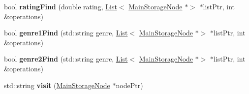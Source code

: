 \begin{DoxyCompactItemize}
\item 
\mbox{\label{class_main_storage_aeb4e48db87901ecb60d3ece8aa3c44ee}} 
bool {\bfseries rating\+Find} (double rating, \hyperlink{class_list}{List}$<$ \hyperlink{class_main_storage_node}{Main\+Storage\+Node} $\ast$$>$ $\ast$list\+Ptr, int \&operations)
\item 
\mbox{\label{class_main_storage_acc8e3b85d74cffa65ae1804c00fcdc48}} 
bool {\bfseries genre1\+Find} (std\+::string genre, \hyperlink{class_list}{List}$<$ \hyperlink{class_main_storage_node}{Main\+Storage\+Node} $\ast$$>$ $\ast$list\+Ptr, int \&operations)
\item 
\mbox{\label{class_main_storage_a95ea93d5b8bf1718b939fe21fb601695}} 
bool {\bfseries genre2\+Find} (std\+::string genre, \hyperlink{class_list}{List}$<$ \hyperlink{class_main_storage_node}{Main\+Storage\+Node} $\ast$$>$ $\ast$list\+Ptr, int \&operations)
\item 
\mbox{\label{class_main_storage_af0bbc44a648395b758a8f8664d7b1fa6}} 
std\+::string {\bfseries visit} (\hyperlink{class_main_storage_node}{Main\+Storage\+Node} $\ast$node\+Ptr)
\end{DoxyCompactItemize}
